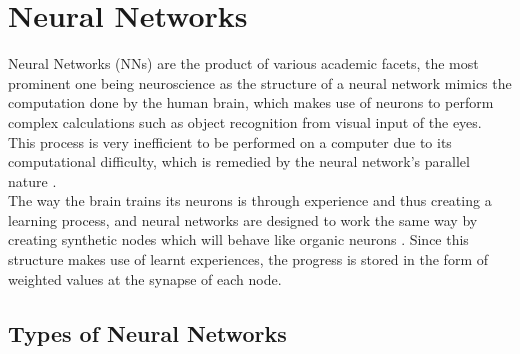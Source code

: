     \chapter[Neural Networks]{Neural Networks}
\label{ch:neural-networks}
Neural Networks (NNs) are the product of various academic facets, the most prominent one being neuroscience as the structure of a neural network mimics the computation done by the human brain, which makes use of neurons to perform complex calculations such as object recognition from visual input of the eyes. This process is very inefficient to be performed on a computer due to its computational difficulty, which is remedied by the neural network's parallel nature \cite{GURESEN2011426}. \\

The way the brain trains its neurons is through experience and thus creating a learning process, and neural networks are designed to work the same way by creating synthetic nodes which will behave like organic neurons \cite{Haykin:1994:NNC:541500}. Since this structure makes use of learnt experiences, the progress is stored in the form of weighted values at the synapse of each node. \cite{GURESEN2011426}

\section{Types of Neural Networks}

